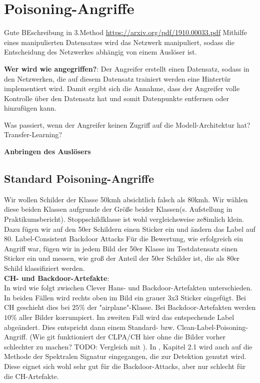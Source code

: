 \documentclass[11pt,a4paper]{article}
\numberwithin{equation}{section}
\begin{document}
	
	\section{Poisoning-Angriffe} \label{chapter_poisoningattacks}
	Gute BEschreibung in 3.Method \url{https://arxiv.org/pdf/1910.00033.pdf}
	Mithilfe eines manipulierten Datensatzes wird das Netzwerk manipuliert, sodass die Entscheidung des Netzwerkes abhängig von einem Auslöser ist.
	
	\noindent \textbf{Wer wird wie angegriffen?}: Der Angreifer erstellt einen Datensatz, sodass in den Netzwerken, die auf diesem Datensatz trainiert werden eine Hintertür implementiert wird. Damit ergibt sich die Annahme, dass der Angreifer volle Kontrolle über den Datensatz hat und somit Datenpunkte entfernen oder hinzufügen kann.
	
	Was passiert, wenn der Angreifer keinen Zugriff auf die Modell-Architektur hat? Transfer-Learning? 
	
	\noindent \textbf{Anbringen des Auslösers}
	\subsection{Standard Poisoning-Angriffe}
	Wir wollen Schilder der Klasse 50kmh absichtlich falsch als 80kmh. Wir wählen diese beiden Klassen aufgrunde der Größe beider Klassen(s. Aufstellung in Praktikumsbericht). Stoppschildklasse ist wohl vergleichsweise ze8imlich klein.\\
	
	Dazu fügen wir auf den 50er Schildern einen Sticker ein und ändern das Label auf 80.
	Label-Consistent
	Backdoor Attacks
	Für die Bewertung, wie erfolgreich ein Angriff war, fügen wir in jedem Bild der 50er Klasse im Testdatensatz einen Sticker ein und messen, wie groß der Anteil der 50er Schilder ist, die als 80er Schild klassifiziert werden.\\
	
	\noindent \textbf{CH- und Backdoor-Artefakte}:\\
	In \cite{imagenet_unhansed_v2} wird wie folgt zwischen Clever Hans- und Backdoor-Artefakten unterschieden. In beiden Fällen wird rechts oben im Bild ein grauer 3x3 Sticker eingefügt.
	Bei CH geschieht dies bei $25 \%$ der "airplane"-Klasse. Bei Backdoor-Artefakten werden $10 \%$ aller Bilder korrumpiert. Im zweiten Fall wird das entspechende Label abgeändert. Dies entspricht dann einem Standard- bzw. Clean-Label-Poisoning-Angriff. (Wie git funktioniert der CLPA/CH hier ohne die Bilder vorher schlechter zu machen? TODO: Vergleich mit \cite{labelconsistent}). In \cite{imagenet_unhansed_v2}, Kapitel 2.1 wird auch auf die Methode der Spektralen Signatur \cite{spectral_signatures} eingegangen, die zur Detektion genutzt wird. Diese eignet sich wohl sehr gut für die Backdoor-Attacks, aber nur schlecht für die CH-Artefakte.
	
\end{document}
